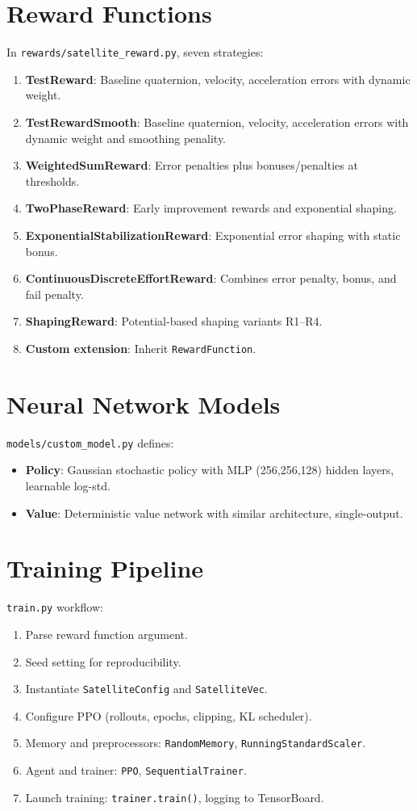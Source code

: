 \documentclass[a4paper,oneside]{book}
\theoremstyle{definition}
\begin{document}
\section{Reward Functions}
In \texttt{rewards/satellite\_reward.py}, seven strategies:
\begin{enumerate}
\item \textbf{TestReward}: Baseline quaternion, velocity, acceleration errors with dynamic weight.
\item \textbf{TestRewardSmooth}: Baseline quaternion, velocity, acceleration errors with dynamic weight and smoothing penality.
\item \textbf{WeightedSumReward}: Error penalties plus bonuses/penalties at thresholds.
\item \textbf{TwoPhaseReward}: Early improvement rewards and exponential shaping.
\item \textbf{ExponentialStabilizationReward}: Exponential error shaping with static bonus.
\item \textbf{ContinuousDiscreteEffortReward}: Combines error penalty, bonus, and fail penalty.
\item \textbf{ShapingReward}: Potential-based shaping variants R1–R4.
\item \textbf{Custom extension}: Inherit \texttt{RewardFunction}.
\end{enumerate}

\section{Neural Network Models}
\texttt{models/custom\_model.py} defines:
\begin{itemize}
\item \textbf{Policy}: Gaussian stochastic policy with MLP (256,256,128) hidden layers, learnable log-std.
\item \textbf{Value}: Deterministic value network with similar architecture, single-output.
\end{itemize}

\section{Training Pipeline}
\texttt{train.py} workflow:
\begin{enumerate}
\item Parse reward function argument.
\item Seed setting for reproducibility.
\item Instantiate \texttt{SatelliteConfig} and \texttt{SatelliteVec}.
\item Configure PPO (rollouts, epochs, clipping, KL scheduler).
\item Memory and preprocessors: \texttt{RandomMemory}, \texttt{RunningStandardScaler}.
\item Agent and trainer: \texttt{PPO}, \texttt{SequentialTrainer}.
\item Launch training: \texttt{trainer.train()}, logging to TensorBoard.
\end{enumerate}
\end{document}
